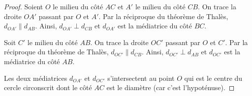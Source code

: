 \documentclass[a4paper,12pt]{report}
\begin{document}
\begin{proof}
\begin{minipage}[t]{0.5\textwidth}{
\vspace{0pt}
Soient $O$ le milieu du côté $AC$ et $A'$ le milieu du côté $CB$. On trace la droite $OA'$ passant par $O$ et $A'$. Par la réciproque du théorème de Thalès, $d_{OA'}\| d_{AB}$. Ainsi, $d_{OA'}\perp d_{CB}$ et $d_{OA'}$ est la médiatrice du côté $BC$.
\medskip

Soit $C'$ le milieu du côté $AB$. On trace la droite $OC'$ passant par $O$ et $C'$. Par la réciproque du théorème de Thalès, $d_{OC'}\| d_{CB}$. Ainsi, $d_{OC'}\perp d_{AB}$ et $d_{OC'}$ est la médiatrice du côté $AB$.
\medskip

Les deux médiatrices $d_{OA'}$ et $d_{OC'}$ s'intersectent au point $O$ qui est le centre du cercle circonscrit dont le côté $AC$ est le diamètre (car c'est l'hypoténuse). 
}
\end{minipage}
\hfill
\begin{minipage}[t]{0.4\textwidth}{
\vspace{0pt}

}
\end{minipage}

\end{proof}
\end{document}
